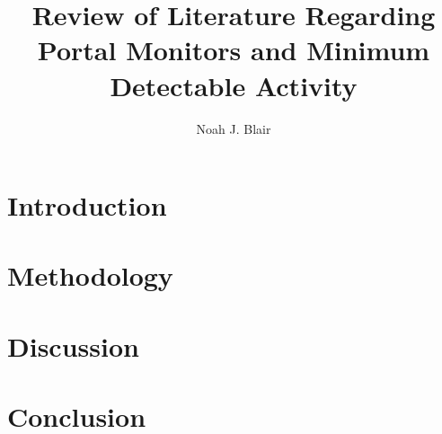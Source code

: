 \documentclass[12 pt]{paper}
\title{Review of Literature Regarding Portal Monitors and Minimum Detectable Activity}
\author{Noah J. Blair}
\begin{document}
\maketitle
\begin{abstract}
  \noindent
  
\end{abstract}
\tableofcontents
\newpage
\section{Introduction}\label{toc:s.introduction}

\section{Methodology}\label{toc:s.methodology}

\section{Discussion}\label{toc:s.discussion}

\section{Conclusion}\label{toc:s.conclusion}



{}

\csuHonorPledge
\end{document}
